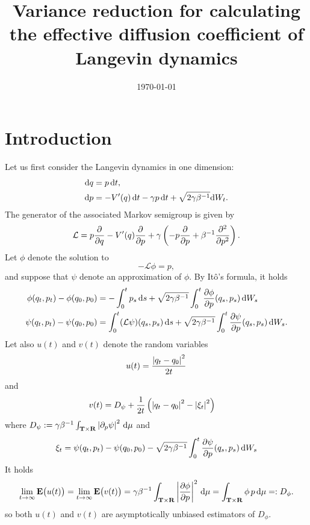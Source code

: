 \documentclass[11pt,a4paper]{article}
\date{\today}
\title{Variance reduction for calculating the effective diffusion coefficient of Langevin dynamics}
\author{%
}
\newcommand{\expect}[0]{\mathbf{E}}
\newcommand{\real}{\mathbf R}
\newcommand{\torus}{\mathbf T}
\renewcommand{\d}{\mathrm d}
\theoremstyle{plain}
\numberwithin{equation}{section}
\begin{document}
\maketitle

\section{Introduction}%
Let us first consider the Langevin dynamics in one dimension:
\begin{subequations}
\begin{align}
    \label{eq:Langevin_q}
    \d q &= p \, \d t, \\
    \label{eq:Langevin_p}
    \d p &= - \derivative*{1}[V]{q}(q) \, \d t - \gamma p \, \d t + \sqrt{2 \gamma \beta^{-1}} \d W_t.
\end{align}
\end{subequations}
The generator of the associated Markov semigroup is given by
\[
    \mathcal L = p \derivative{1}{q} - \derivative*{1}[V]{q}(q) \derivative{1}{p} + \gamma \left( - p \derivative{1}{p} + \beta^{-1} \derivative{2}{p^2} \right).
\]
Let $\phi$ denote the solution to
\[
    - \mathcal L \phi = p,
\]
and suppose that $\psi$ denote an approximation of $\phi$.
By It\^o's formula, it holds
\begin{align}
    \notag
    \phi(q_t, p_t) - \phi(q_0, p_0) &= - \int_{0}^{t} p_s \, \d s + \sqrt{2 \gamma \beta^{-1}} \int_{0}^{t} \derivative{1}[\phi]{p}(q_s, p_s) \, \d W_s \\
    \label{eq:ito_control}
    \psi(q_t, p_t) - \psi(q_0, p_0) &= \int_{0}^{t} (\mathcal L \psi) (q_s, p_s) \, \d s + \sqrt{2 \gamma \beta^{-1}} \int_{0}^{t} \derivative{1}[\psi]{p}(q_s, p_s) \, \d W_s.
\end{align}
Let also $u(t)$ and $v(t)$ denote the random variables
\[
    u(t) = \frac{\abs{q_t - q_0}^2}{2t}
\]
and
\begin{align*}
    v(t) &= D_{\psi}+ \frac{1}{2t} \left( \abs{q_t - q_0}^2 - \abs{\xi_t}^2\right)
\end{align*}
where $D_{\psi} := \gamma \beta^{-1} \int_{\torus \times \real} \abs{\derivative{1}[\psi]{p}}^2 \, \d \mu$ and
 \[
    \xi_t = \psi(q_t, p_t) - \psi(q_0, p_0) - \sqrt{2 \gamma \beta^{-1}} \int_{0}^{t} \derivative{1}[\psi]{p}(q_s, p_s) \, \d W_s
 \]
It holds
\[
    \lim_{t \to \infty} \expect \bigl( u(t) \bigr) = \lim_{t \to \infty} \expect \bigl( v(t) \bigr)
    = \gamma \beta^{-1} \int_{\torus \times \real} \abs{\derivative{1}[\phi]{p}}^2 \, \d \mu
    = \int_{\torus \times \real} \phi \, p \, \d \mu =: D_{\phi}.
\]
so both $u(t)$ and $v(t)$ are asymptotically unbiased estimators of $D_{\phi}$.
\end{document}
